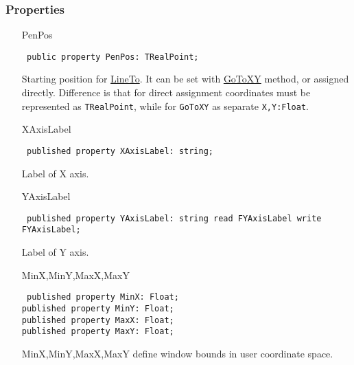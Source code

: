 \documentclass[12pt,a4paper,oneside]{report}
\newcommand{\declarationitem}[1]{{\addfontfeatures{FakeSlant} #1}}
\newcommand{\inlineitem}[1]{{\addfontfeatures{FakeBold} #1}}
\newcommand{\code}[1]{\texttt{#1}}
\begin{document}
\subsubsection{Properties}
\begin{itemize}\label{lmcoordsys.TCoordSys-PenPos}
\item[\inlineitem{PenPos}\hfill]
\begin{flushleft}
\code{
public property PenPos: TRealPoint;}
\end{flushleft}

Starting position for \hyperref[sec:lineto]{LineTo}. It can be set with \hyperref[lmcoordsys.TCoordSys-GoToXY]{GoToXY} method, or assigned directly. Difference is that for direct assignment coordinates must be represented as \code{TRealPoint}, while for \code{GoToXY} as separate \code{X,Y:Float}. \label{lmcoordsys.TCoordSys-XAxisLabel}
\item[\inlineitem{XAxisLabel}\hfill]
\begin{flushleft}
\code{
published property XAxisLabel: string;}\label{lmcoordsys.TCoordSys-YAxisLabel}
\end{flushleft}

Label of X axis.
\item[\declarationitem{YAxisLabel}\hfill]
\begin{flushleft}
\code{
published property YAxisLabel: string read FYAxisLabel write FYAxisLabel;}
\end{flushleft}
\par Label of Y axis.  
\item[\inlineitem{MinX,MinY,MaxX,MaxY}\hfill]
\begin{flushleft}
\code{
published property MinX: Float;\\
published property MinY: Float;\\
published property MaxX: Float;\\
published property MaxY: Float;
}
\end{flushleft}
\label{lmcoordsys.TCoordSys-MinX}
 MinX,MinY,MaxX,MaxY define window bounds in user coordinate space.\label{lmcoordsys.TCoordSys-MinY}
\label{lmcoordsys.TCoordSys-XPos}


\end{itemize}
\end{document}
